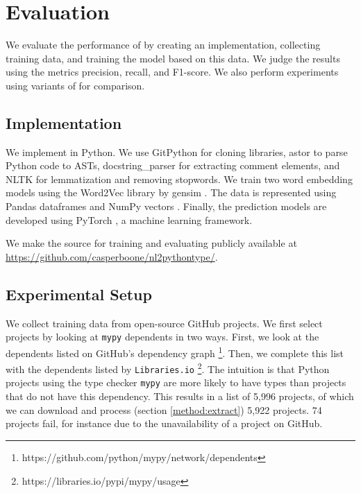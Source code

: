 \section{Evaluation}
We evaluate the performance of \dltpy{} by creating an implementation, collecting training data, and training the model based on this data. We judge the results using the metrics precision, recall, and F1-score. We also perform experiments using variants of \dltpy{} for comparison.

\subsection{Implementation} \label{evaluation:implementation}
We implement \dltpy{} in Python. We use GitPython \cite{2008GitPython} for cloning libraries, astor \cite{2012Astor} to parse Python code to ASTs, docstring\_parser \cite{2018Docstring_parser} for extracting comment elements, and NLTK \cite{Bird2009NaturalPython} for lemmatization and removing stopwords. We train two word embedding models using the Word2Vec \cite{Mikolov2013EfficientSpace} library by gensim \cite{Rehurek2010SoftwareCorpora}. The data is represented using Pandas dataframes \cite{McKinney2010DataPython} and NumPy vectors \cite{vanderWalt2011TheComputation}. Finally, the prediction models are developed using PyTorch \cite{Paszke2017AutomaticPyTorch}, a machine learning framework.

We make the source for training and evaluating \dltpy{} publicly available at \url{https://github.com/casperboone/nl2pythontype/}.

\subsection{Experimental Setup}
We collect training data from open-source GitHub projects. We first select projects by looking at \texttt{mypy} \cite{2012Mypy} dependents in two ways.
First, we look at the dependents listed on GitHub's dependency graph \footnote{https://github.com/python/mypy/network/dependents}.
Then, we complete this list with the dependents listed by \texttt{Libraries.io} \footnote{https://libraries.io/pypi/mypy/usage}.
The intuition is that Python projects using the type checker \texttt{mypy} are more likely to have types than projects that do not have this dependency. This results in a list of 5,996 projects, of which we can download and process (section \ref{method:extract}) 5,922 projects. 74 projects fail, for instance due to the unavailability of a project on GitHub.

